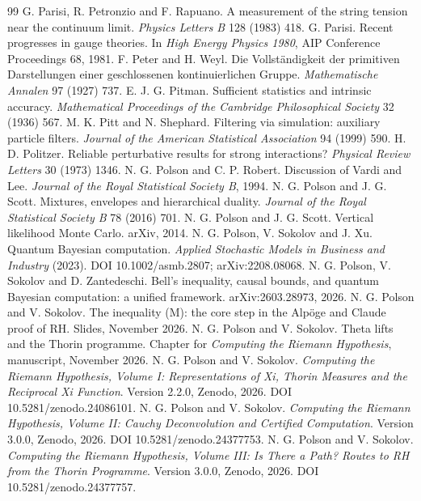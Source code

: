 \begin{thebibliography}{99}
 G. Parisi, R. Petronzio and F. Rapuano. A measurement of the string tension near the continuum limit. \emph{Physics Letters B} 128 (1983) 418.
 G. Parisi. Recent progresses in gauge theories. In \emph{High Energy Physics 1980}, AIP Conference Proceedings 68, 1981.
 F. Peter and H. Weyl. Die Vollst\"andigkeit der primitiven Darstellungen einer geschlossenen kontinuierlichen Gruppe. \emph{Mathematische Annalen} 97 (1927) 737.
 E. J. G. Pitman. Sufficient statistics and intrinsic accuracy. \emph{Mathematical Proceedings of the Cambridge Philosophical Society} 32 (1936) 567.
 M. K. Pitt and N. Shephard. Filtering via simulation: auxiliary particle filters. \emph{Journal of the American Statistical Association} 94 (1999) 590.
 H. D. Politzer. Reliable perturbative results for strong interactions? \emph{Physical Review Letters} 30 (1973) 1346.
 N. G. Polson and C. P. Robert. Discussion of Vardi and Lee. \emph{Journal of the Royal Statistical Society B}, 1994.
 N. G. Polson and J. G. Scott. Mixtures, envelopes and hierarchical duality. \emph{Journal of the Royal Statistical Society B} 78 (2016) 701.
 N. G. Polson and J. G. Scott. Vertical likelihood Monte Carlo. arXiv, 2014.
 N. G. Polson, V. Sokolov and J. Xu. Quantum Bayesian computation. \emph{Applied Stochastic Models in Business and Industry} (2023). DOI 10.1002/asmb.2807; arXiv:2208.08068.
 N. G. Polson, V. Sokolov and D. Zantedeschi. Bell's inequality, causal bounds, and quantum Bayesian computation: a unified framework. arXiv:2603.28973, 2026.
 N. G. Polson and V. Sokolov. The inequality (M): the core step in the Alp\"oge and Claude proof of RH. Slides, November 2026.
 N. G. Polson and V. Sokolov. Theta lifts and the Thorin programme. Chapter for \emph{Computing the Riemann Hypothesis}, manuscript, November 2026.
 N. G. Polson and V. Sokolov. \emph{Computing the Riemann Hypothesis, Volume I: Representations of Xi, Thorin Measures and the Reciprocal Xi Function}. Version 2.2.0, Zenodo, 2026. DOI 10.5281/zenodo.24086101.
 N. G. Polson and V. Sokolov. \emph{Computing the Riemann Hypothesis, Volume II: Cauchy Deconvolution and Certified Computation}. Version 3.0.0, Zenodo, 2026. DOI 10.5281/zenodo.24377753.
 N. G. Polson and V. Sokolov. \emph{Computing the Riemann Hypothesis, Volume III: Is There a Path? Routes to RH from the Thorin Programme}. Version 3.0.0, Zenodo, 2026. DOI 10.5281/zenodo.24377757.

\end{thebibliography}
